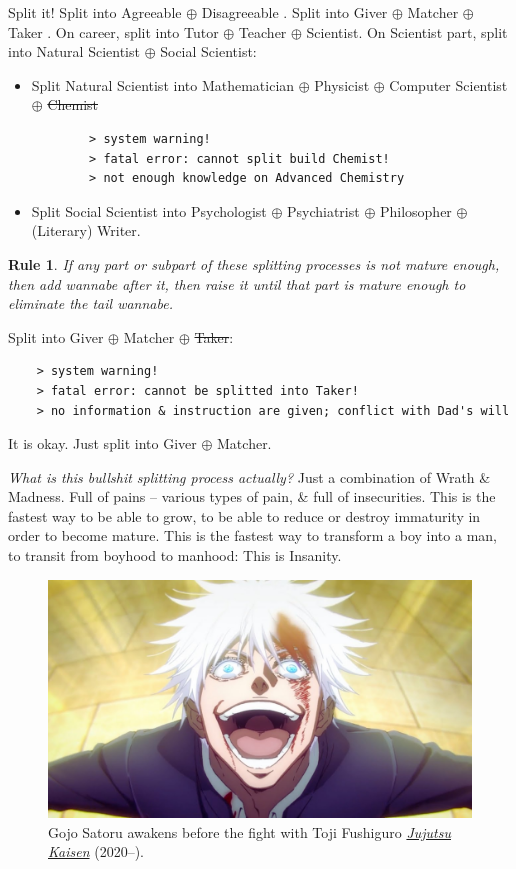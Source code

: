 \documentclass[12pt]{article}
\newtheorem{Rule}{Rule}
\begin{document}
Split it! Split into Agreeable $\oplus$ Disagreeable \cite{Little_personality,Little_personality_VN}. Split into Giver $\oplus$ Matcher $\oplus$ Taker \cite{Grant_give_take,Grant_give_take_VN}. On career, split into Tutor $\oplus$ Teacher $\oplus$ Scientist. On Scientist part, split into Natural Scientist $\oplus$ Social Scientist:
\begin{itemize}
	\item Split Natural Scientist into Mathematician $\oplus$ Physicist $\oplus$ Computer Scientist $\oplus$ \st{Chemist}
	\begin{verbatim}
		> system warning!
		> fatal error: cannot split build Chemist!
		> not enough knowledge on Advanced Chemistry
	\end{verbatim}
	\item Split Social Scientist into Psychologist $\oplus$ Psychiatrist $\oplus$ Philosopher $\oplus$ (Literary) Writer.
\end{itemize}

\begin{Rule}
	If any part or subpart of these splitting processes is not mature enough, then add {\it wannabe} after it, then raise it until that part is mature enough to eliminate the tail {\it wannabe}.
\end{Rule}
Split into Giver $\oplus$ Matcher $\oplus$ \st{Taker}:
\begin{verbatim}
	> system warning!
	> fatal error: cannot be splitted into Taker!
	> no information & instruction are given; conflict with Dad's will
\end{verbatim}
It is okay. Just split into Giver $\oplus$ Matcher.

{\it What is this bullshit splitting process actually?} Just a combination of {\sf Wrath} \& {\sf Madness}. Full of pains -- various types of pain, \& full of insecurities. This is the fastest way to be able to grow, to be able to reduce or destroy immaturity in order to become mature. This is the fastest way to transform a boy into a man, to transit from boyhood to manhood: This is {\sc Insanity}.

\begin{figure}[H]
	\centering
	\includegraphics[width = 15cm]{Gojo_awaken}
	\caption{{\sc Gojo Satoru} awakens before the fight with {\sc Toji Fushiguro} \href{https://www.imdb.com/title/tt12343534/}{\it Jujutsu Kaisen} (2020--).}
\end{figure}
\end{document}
